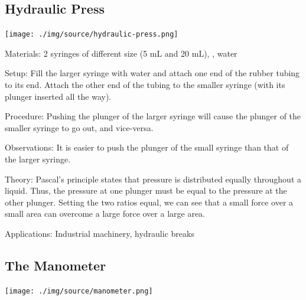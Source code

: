 \begin{multicols}{2}
\subsection{Hydraulic Press}

\begin{center}
\texttt{[image: ./img/source/hydraulic-press.png]}
\end{center}

\columnbreak

\begin{description*}
\item[Materials:]{2 syringes of different size (5 mL and 20 mL), , water}
\item[Setup:]{Fill the larger syringe with water and attach one end of the rubber tubing to its end. Attach the other end of the tubing to the smaller syringe (with its plunger inserted all the way).}
\item[Procedure:]{Pushing the plunger of the larger syringe will cause the plunger of the smaller syringe to go out, and vice-versa.}
\item[Observations:]{It is easier to push the plunger of the small syringe than that of the larger syringe.}
\item[Theory:]{Pascal's principle states that pressure is distributed equally throughout a liquid. Thus, the pressure at one plunger must be equal to the pressure at the other plunger. Setting the two ratios equal, we can see that a small force over a small area can overcome a large force over a large area.}
\item[Applications:]{Industrial machinery, hydraulic breaks}
\end{description*}

\subsection{The Manometer}

\begin{center}
\texttt{[image: ./img/source/manometer.png]}
\end{center}


\end{multicols}
